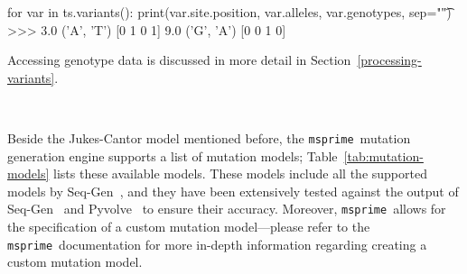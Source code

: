 \documentclass[graybox]{svmult}
\newcommand{\msprime}[0]{\texttt{msprime}}
\begin{document}
\begin{pythoncode}
for var in ts.variants():
    print(var.site.position, var.alleles, var.genotypes, sep="\t")
>>> 3.0	('A', 'T')	[0 1 0 1]
    9.0	('G', 'A')	[0 0 1 0]
\end{pythoncode}

Accessing genotype data is discussed in more detail in Section~\ref{processing-variants}.

 \

Beside the Jukes-Cantor model mentioned before, the \msprime\ mutation generation engine supports a list of mutation models; Table~\ref{tab:mutation-models}
lists these available models. These models include all the supported models by Seq-Gen~\citep{rambaut1997seq}, and they have been extensively tested against the
output of Seq-Gen~\citep{rambaut1997seq} and Pyvolve~\citep{spielman2015pyvolve} to ensure their accuracy. Moreover, \msprime\ allows for the specification of a custom mutation model—please refer
to the \msprime\ documentation for more in-depth information regarding creating a custom mutation model.
\end{document}
